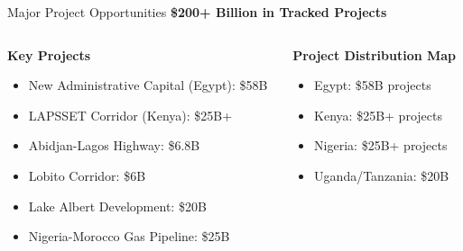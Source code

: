 \documentclass[aspectratio=169]{beamer}
\begin{document}
\begin{frame}{Major Project Opportunities}
    \textbf{\$200+ Billion in Tracked Projects}
    
    \vspace{0.5cm}
    \begin{columns}
        \begin{column}{0.5\textwidth}
            \textbf{Key Projects}
            \begin{itemize}
                \item New Administrative Capital (Egypt): \$58B
                \item LAPSSET Corridor (Kenya): \$25B+
                \item Abidjan-Lagos Highway: \$6.8B
                \item Lobito Corridor: \$6B
                \item Lake Albert Development: \$20B
                \item Nigeria-Morocco Gas Pipeline: \$25B
            \end{itemize}
        \end{column}
        \begin{column}{0.5\textwidth}
            \begin{center}
                \textbf{Project Distribution Map}
                \vspace{0.5cm}
                \begin{itemize}
                    \item Egypt: \$58B projects
                    \item Kenya: \$25B+ projects
                    \item Nigeria: \$25B+ projects
                    \item Uganda/Tanzania: \$20B
                \end{itemize}
            \end{center}
        \end{column}
    \end{columns}
\end{frame}
\end{document}
